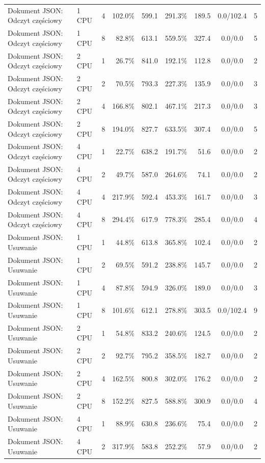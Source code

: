 \begin{table}[ht]
{\begin{tabular}{llcrrrrcc}
Dokument JSON: Odczyt częściowy & 1 CPU & 4 & 102.0\% & 599.1 & 291.3\% & 189.5 & 0.0/102.4 & 5 \\
Dokument JSON: Odczyt częściowy & 1 CPU & 8 & 82.8\% & 613.1 & 559.5\% & 327.4 & 0.0/0.0 & 5 \\
Dokument JSON: Odczyt częściowy & 2 CPU & 1 & 26.7\% & 841.0 & 192.1\% & 112.8 & 0.0/0.0 & 2 \\
Dokument JSON: Odczyt częściowy & 2 CPU & 2 & 70.5\% & 793.3 & 227.3\% & 135.9 & 0.0/0.0 & 3 \\
Dokument JSON: Odczyt częściowy & 2 CPU & 4 & 166.8\% & 802.1 & 467.1\% & 217.3 & 0.0/0.0 & 3 \\
Dokument JSON: Odczyt częściowy & 2 CPU & 8 & 194.0\% & 827.7 & 633.5\% & 307.4 & 0.0/0.0 & 5 \\
Dokument JSON: Odczyt częściowy & 4 CPU & 1 & 22.7\% & 638.2 & 191.7\% & 51.6 & 0.0/0.0 & 2 \\
Dokument JSON: Odczyt częściowy & 4 CPU & 2 & 49.7\% & 587.0 & 264.6\% & 74.1 & 0.0/0.0 & 2 \\
Dokument JSON: Odczyt częściowy & 4 CPU & 4 & 217.9\% & 592.4 & 453.3\% & 161.7 & 0.0/0.0 & 3 \\
Dokument JSON: Odczyt częściowy & 4 CPU & 8 & 294.4\% & 617.9 & 778.3\% & 285.4 & 0.0/0.0 & 4 \\
Dokument JSON: Usuwanie & 1 CPU & 1 & 44.8\% & 613.8 & 365.8\% & 102.4 & 0.0/0.0 & 2 \\
Dokument JSON: Usuwanie & 1 CPU & 2 & 69.5\% & 591.2 & 238.8\% & 145.7 & 0.0/0.0 & 2 \\
Dokument JSON: Usuwanie & 1 CPU & 4 & 87.8\% & 594.9 & 326.0\% & 189.0 & 0.0/0.0 & 3 \\
Dokument JSON: Usuwanie & 1 CPU & 8 & 101.6\% & 612.1 & 278.8\% & 303.5 & 0.0/102.4 & 9 \\
Dokument JSON: Usuwanie & 2 CPU & 1 & 54.8\% & 833.2 & 240.6\% & 124.5 & 0.0/0.0 & 2 \\
Dokument JSON: Usuwanie & 2 CPU & 2 & 92.7\% & 795.2 & 358.5\% & 182.7 & 0.0/0.0 & 2 \\
Dokument JSON: Usuwanie & 2 CPU & 4 & 162.5\% & 800.8 & 302.0\% & 176.2 & 0.0/0.0 & 2 \\
Dokument JSON: Usuwanie & 2 CPU & 8 & 152.2\% & 827.5 & 588.8\% & 300.9 & 0.0/0.0 & 4 \\
Dokument JSON: Usuwanie & 4 CPU & 1 & 88.9\% & 630.8 & 236.6\% & 75.4 & 0.0/0.0 & 2 \\
Dokument JSON: Usuwanie & 4 CPU & 2 & 317.9\% & 583.8 & 252.2\% & 57.9 & 0.0/0.0 & 2 \\

\end{tabular}}
\end{table}
